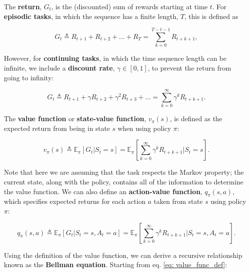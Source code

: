 The \textbf{return}, $G_t$, is the (discounted) sum of rewards starting at time $t$. For \textbf{episodic tasks}, in which the sequence has a finite length, $T$, this is defined as 

\begin{equation}
G_t \triangleq R_{t+1} + R_{t+2} + \dots + R_T = \sum_{k=0}^{T - t - 1} R_{t + k + 1},
\end{equation}

\noindent However, for \textbf{continuing tasks}, in which the time sequence length can be infinite, we include a \textbf{discount rate}, $\gamma \in [0, 1]$, to prevent the return from going to infinity:

\begin{equation}
G_t \triangleq R_{t+1} + \gamma R_{t+2} + \gamma^2 R_{t+3} + \dots = \sum_{k=0}^{\infty} \gamma^k R_{t + k + 1}.
\end{equation}

The \textbf{value function} or \textbf{state-value function}, $v_\pi (s)$, is defined as the expected return from being in state $s$ when using policy $\pi$:

\begin{equation}
	v_\pi (s) \triangleq \mathbb{E}_\pi \left[ G_t | S_t = s \right] = \mathbb{E}_\pi \left[ \sum_{k=0}^{\infty} \gamma^k R_{t + k + 1} | S_t = s \right].
	\label{eq: value_func_def}
\end{equation}

\noindent Note that here we are assuming that the task respects the Markov property; the current state, along with the policy, contains all of the information to determine the value function. We can also define an \textbf{action-value function}, $q_\pi (s, a)$, which specifies expected returns for each action $a$ taken from state $s$ using policy $\pi$:

\begin{equation}
	q_\pi (s, a) \triangleq \mathbb{E}_\pi \left[ G_t | S_t = s, A_t = a \right] = \mathbb{E}_\pi \left[ \sum_{k=0}^{\infty} \gamma^k R_{t + k + 1} | S_t = s, A_t = a \right].
\end{equation}

Using the definition of the value function, we can derive a recursive relationship known as the \textbf{Bellman equation}. Starting from eq. \ref{eq: value_func_def}:

